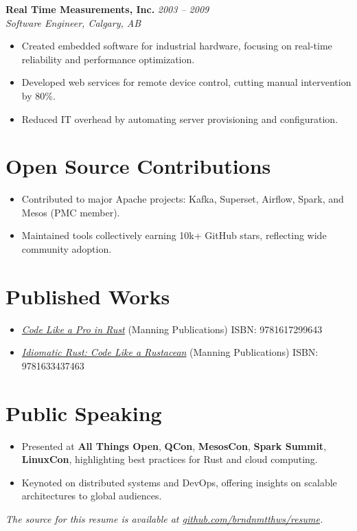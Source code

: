 \documentclass[margin,line]{resume}
\begin{document}
\begin{resume}
\filbreak
\textbf{Real Time Measurements, Inc.} \hfill \textit{2003 -- 2009}\\
\textit{Software Engineer, Calgary, AB}

\begin{itemize}
    \item Created embedded software for industrial hardware, focusing on real-time reliability and performance optimization.
    \item Developed web services for remote device control, cutting manual intervention by 80\%.
    \item Reduced IT overhead by automating server provisioning and configuration.
\end{itemize}

\vspace{10pt}

\section{Open Source Contributions}

\begin{itemize}[nosep]
    \item Contributed to major Apache projects: Kafka, Superset, Airflow, Spark, and Mesos (PMC member).
    \item Maintained tools collectively earning 10k+ GitHub stars, reflecting wide community adoption.
\end{itemize}

\vspace{10pt}

\section{Published Works}

\begin{itemize}[nosep]
    \item \href{https://www.manning.com/books/code-like-a-pro-in-rust}{\textit{Code Like a Pro in Rust}} (Manning Publications) \hfill ISBN: 9781617299643
    \item \href{https://www.manning.com/books/idiomatic-rust}{\textit{Idiomatic Rust: Code Like a Rustacean}} (Manning Publications) \hfill ISBN: 9781633437463
\end{itemize}

\vspace{10pt}

\section{Public Speaking}

\begin{itemize}[nosep]
    \item Presented at \textbf{All Things Open}, \textbf{QCon}, \textbf{MesosCon}, \textbf{Spark Summit}, \textbf{LinuxCon}, highlighting best practices for Rust and cloud computing.
    \item Keynoted on distributed systems and DevOps, offering insights on scalable architectures to global audiences.
\end{itemize}

\end{resume}

\vspace*{\fill}

\textit{The source for this resume is available at \href{https://github.com/brndnmtthws/resume}{github.com/brndnmtthws/resume}.}
\end{document}
